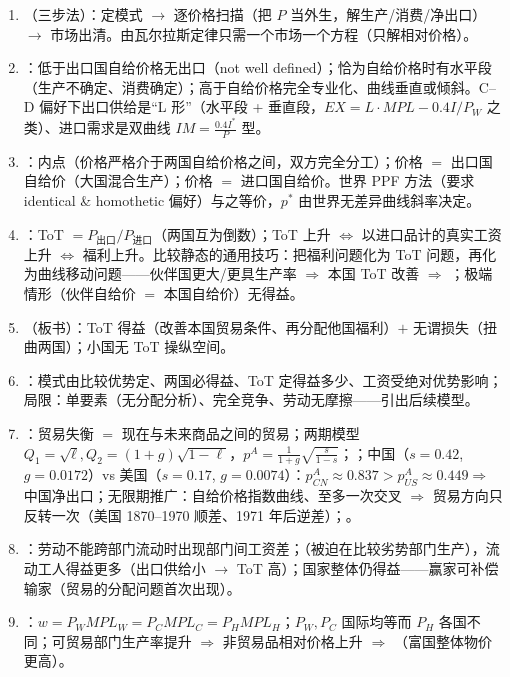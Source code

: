 \begin{sumbox}
\begin{enumerate}
  \item {}（三步法）：定模式 $\to$ 逐价格扫描（把 $P$ 当外生，解生产/消费/净出口）$\to$ 市场出清。由瓦尔拉斯定律只需一个市场一个方程（只解相对价格）。
  \item {}：低于出口国自给价格无出口（not well defined）；恰为自给价格时有水平段（生产不确定、消费确定）；高于自给价格完全专业化、曲线垂直或倾斜。C--D 偏好下出口供给是``L 形''（水平段 + 垂直段，$EX = L \cdot MPL - 0.4I/P_W$ 之类）、进口需求是双曲线 $IM = \frac{0.4 I^*}{P}$ 型。
  \item {}：内点（价格严格介于两国自给价格之间，双方完全分工）；价格 $=$ 出口国自给价（大国混合生产）；价格 $=$ 进口国自给价。世界 PPF 方法（要求 identical \& homothetic 偏好）与之等价，$p^*$ 由世界无差异曲线斜率决定。
  \item {}：ToT $= P_\text{出口}/P_\text{进口}$（两国互为倒数）；ToT 上升 $\Leftrightarrow$ 以进口品计的真实工资上升 $\Leftrightarrow$ 福利上升。比较静态的通用技巧：把福利问题化为 ToT 问题，再化为曲线移动问题——伙伴国更大/更具生产率 $\Rightarrow$ 本国 ToT 改善 $\Rightarrow$ ；极端情形（伙伴自给价 $=$ 本国自给价）无得益。
  \item {}（板书）：ToT 得益（改善本国贸易条件、再分配他国福利）$+$ 无谓损失（扭曲两国）；小国无 ToT 操纵空间。
  \item {}：模式由比较优势定、两国必得益、ToT 定得益多少、工资受绝对优势影响；局限：单要素（无分配分析）、完全竞争、劳动无摩擦——引出后续模型。
  \item {}：贸易失衡 $=$ 现在与未来商品之间的贸易；两期模型 $Q_1 = \sqrt{\ell}, Q_2 = (1+g)\sqrt{1-\ell}$，$p^A = \frac{1}{1+g}\sqrt{\frac{s}{1-s}}$；；中国（$s = 0.42$, $g = 0.0172$）vs 美国（$s = 0.17$, $g = 0.0074$）：$p^A_{CN} \approx 0.837 > p^A_{US} \approx 0.449 \Rightarrow$ 中国净出口；无限期推广：自给价格指数曲线、至多一次交叉 $\Rightarrow$ 贸易方向只反转一次（美国 1870--1970 顺差、1971 年后逆差）；。
  \item {}：劳动不能跨部门流动时出现部门间工资差；（被迫在比较劣势部门生产），流动工人得益更多（出口供给小 $\to$ ToT 高）；国家整体仍得益——赢家可补偿输家（贸易的分配问题首次出现）。
  \item {}：$w = P_W MPL_W = P_C MPL_C = P_H MPL_H$；$P_W, P_C$ 国际均等而 $P_H$ 各国不同；可贸易部门生产率提升 $\Rightarrow$ 非贸易品相对价格上升 $\Rightarrow$ （富国整体物价更高）。
\end{enumerate}
\end{sumbox}

